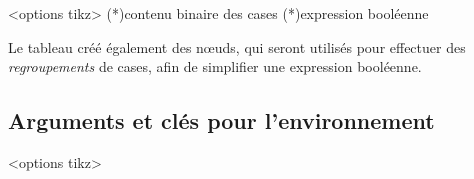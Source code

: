 \documentclass[french,a4paper,11pt]{article}
\begin{document}
{{\begin{DemoCode}
\begin{TableKarnaugh}[clés]<options tikz>
	\KarnaughCasesResult(*){contenu binaire des cases} %
	\KarnaughCasesAuto(*){expression booléenne} %
\end{TableKarnaugh}
\end{DemoCode}
%

\begin{DemoCode}[]
\begin{TableKarnaugh}[Aide]
\end{TableKarnaugh}
\hspace{0.25cm}
\begin{TableKarnaugh}[Variables=u/v/w]
\end{TableKarnaugh}
\hspace{0.25cm}
\begin{TableKarnaugh}[Variables=u/v/w,Swap]
\end{TableKarnaugh}

\begin{center}
	\begin{TableKarnaugh}[Legende=false,Unite=1.5cm,Epaisseur=1.5pt,Couleur=brown]
	\end{TableKarnaugh}
\end{center}
\end{DemoCode}

\begin{tipblock}
Le tableau créé également des nœuds, qui seront utilisés pour effectuer des \textit{regroupements} de cases, afin de simplifier une expression booléenne.
\end{tipblock}

\subsection{Arguments et clés pour l'environnement}

\begin{DemoCode}
\begin{TableKarnaugh}[clés]<options tikz>
\end{TableKarnaugh}
\end{DemoCode}

}}
\end{document}
